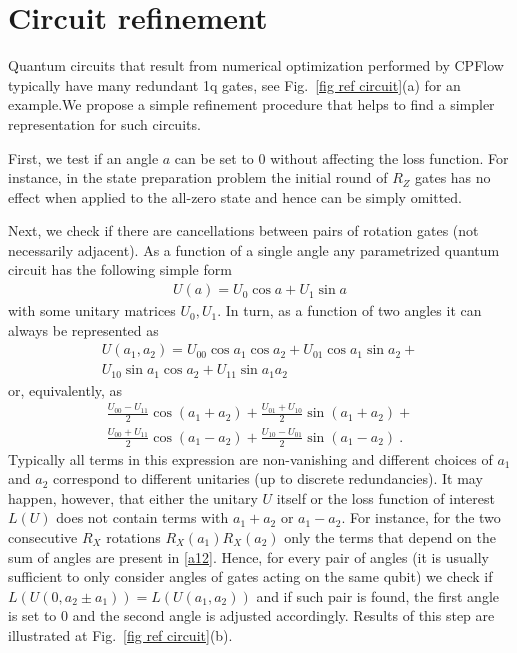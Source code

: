 \documentclass[draft, twocolumn, amsfonts, amssymb, aps, nofootinbib]{revtex4-2}
\newcommand{\package}[1]{\textrm {#1 }}
\newcommand{\cpflow}{\package{CPFlow}}
\begin{document}
\section{Circuit refinement \label{app exact}}
Quantum circuits that result from numerical optimization performed by \cpflow typically have many redundant 1q gates, see Fig.~\ref{fig ref circuit}(a) for an example.We propose a simple refinement procedure that helps to find a simpler representation for such circuits.

First, we test if an angle $a$ can be set to 0 without affecting the loss function. For instance, in the state preparation problem the initial round of $R_Z$ gates has no effect when applied to the all-zero state and hence can be simply omitted.

Next, we check if there are cancellations between pairs of rotation gates (not necessarily adjacent). As a function of a single angle any parametrized quantum circuit has the following simple form
\begin{align}
U(a)=U_0 \cos a+U_1\sin a
\end{align}
with some unitary matrices $U_0, U_1$. In turn, as a function of two angles it can always be represented as
\begin{multline}
U(a_1, a_2)=U_{00}\cos a_1\cos a_2+U_{01}\cos a_1\sin a_2+\\U_{10}\sin a_1\cos a_2+U_{11}\sin a_1 a_2
\end{multline}
or, equivalently, as
\begin{multline}
\frac{U_{00}-U_{11}}2\cos{(a_1+a_2)}+\frac{U_{01}+U_{10}}2\sin{(a_1+a_2)}+\\\frac{U_{00}+U_{11}}2\cos{(a_1-a_2)}+\frac{U_{10}-U_{01}}2\sin{(a_1-a_2)} \ . \label{a12}
\end{multline}
Typically all terms in this expression are non-vanishing and different choices of $a_1$ and $a_2$ correspond to different unitaries (up to discrete redundancies). It may happen, however, that either the unitary $U$ itself or the loss function of interest $L(U)$ does not contain terms with $a_1+a_2$ or $a_1-a_2$. For instance, for the two consecutive $R_X$ rotations $R_X(a_1)R_X(a_2)$ only the terms that depend on the sum of angles are present in \eqref{a12}. Hence, for every pair of angles (it is usually sufficient to only consider angles of gates acting on the same qubit) we check if $L(U(0, a_2\pm a_1))=L(U(a_1, a_2))$  and if such pair is found, the first angle is set to 0 and the second angle is adjusted accordingly. Results of this step are illustrated at Fig.~\ref{fig ref circuit}(b).
\end{document}
